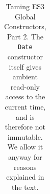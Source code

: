 \documentclass[letterpaper,twocolumn,10pt]{article}
\newcommand{\code}[1]{{\tt {#1}}}              %
\begin{document}
\begin{table}
\begin{tabular}{lll}
\end{tabular}

\caption[Taming ES3 Global Constructors, Part 2.]{Taming ES3 Global
Constructors, Part 2. The \code{Date} constructor itself gives ambient
read-only access to the current time, and is therefore not immutable.
We allow it anyway for reasons explained in the text.} 

\label{tab:taming-es3-1}
\end{table}







\end{document}
